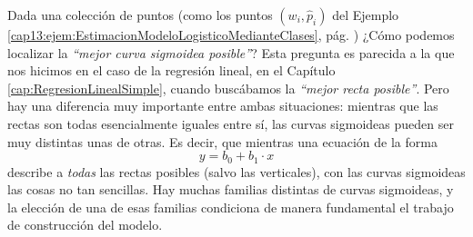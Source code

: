 Dada una colección de puntos (como los puntos $(w_i,\hat p_i)$ del Ejemplo \ref{cap13:ejem:EstimacionModeloLogisticoMedianteClases}, pág. \pageref{cap13:ejem:EstimacionModeloLogisticoMedianteClases}) ¿Cómo podemos localizar la {\em ``mejor curva sigmoidea posible''}? Esta pregunta es parecida a la que nos hicimos en el caso de la regresión lineal, en el Capítulo \ref{cap:RegresionLinealSimple}, cuando buscábamos la {\em ``mejor recta posible''}. Pero hay una diferencia muy importante entre ambas situaciones: mientras que las rectas son todas esencialmente iguales entre sí, las  curvas sigmoideas pueden ser muy distintas unas de otras. Es decir, que mientras una ecuación de la forma
\[y = b_0 + b_1\cdot x\]
describe a {\em todas} las rectas posibles (salvo las verticales), con las curvas sigmoideas las cosas no tan sencillas. Hay muchas familias distintas de curvas sigmoideas, y la elección de una de esas familias condiciona de manera fundamental el trabajo de construcción del modelo.

